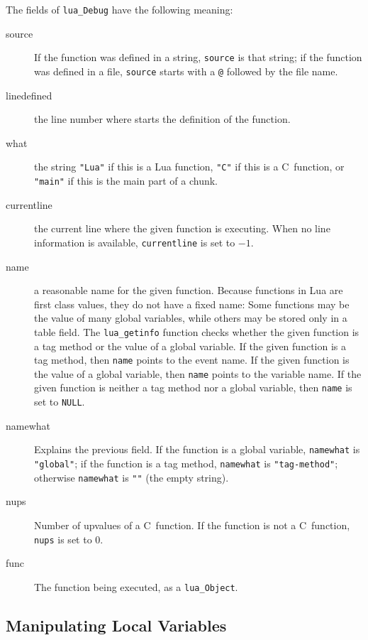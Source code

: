 \documentclass[11pt]{article}
\newcommand{\Math}[1]{$#1$}
\begin{document}
The fields of \verb|lua_Debug| have the following meaning:
\begin{description}

\item[source]
If the function was defined in a string,
\verb|source| is that string;
if the function was defined in a file,
\verb|source| starts with a \verb|@| followed by the file name.

\item[linedefined]
the line number where starts the definition of the function.

\item[what] the string \verb|"Lua"| if this is a Lua function,
\verb|"C"| if this is a C~function,
or \verb|"main"| if this is the main part of a chunk.

\item[currentline]
the current line where the given function is executing.
When no line information is available,
\verb|currentline| is set to \Math{-1}.

\item[name]
a reasonable name for the given function.
Because functions in Lua are first class values,
they do not have a fixed name:
Some functions may be the value of many global variables,
while others may be stored only in a table field.
The \verb|lua_getinfo| function checks whether the given
function is a tag method or the value of a global variable.
If the given function is a tag method,
then \verb|name| points to the event name.
If the given function is the value of a global variable,
then \verb|name| points to the variable name.
If the given function is neither a tag method nor a global variable,
then \verb|name| is set to \verb|NULL|.

\item[namewhat]
Explains the previous field.
If the function is a global variable,
\verb|namewhat| is \verb|"global"|;
if the function is a tag method,
\verb|namewhat| is \verb|"tag-method"|;
otherwise \verb|namewhat| is \verb|""| (the empty string).

\item[nups]
Number of upvalues of a C~function.
If the function is not a C~function,
\verb|nups| is set to 0.

\item[func]
The function being executed, as a \verb|lua_Object|.

\end{description}


\subsection{Manipulating Local Variables}
\end{document}
